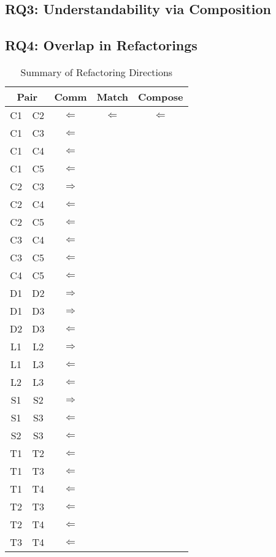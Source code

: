 \subsection{RQ3: Understandability via Composition}

\subsection{RQ4: Overlap in Refactorings}

\begin{table}[t]
\caption{Summary of Refactoring Directions \label{summaryResults}}
\begin{center}
\begin{tabular}{|cc | c c c|} \hline
\multicolumn{2}{|c|}{\textbf{Pair}} & \textbf{Comm} & \textbf{Match} & \textbf{Compose} \\ \hline \hline
C1 & C2 & $\Leftarrow$  & $\Leftarrow$ & $\Leftarrow$ \\
C1 & C3 & $\Leftarrow$ & & \\
C1 & C4 & $\Leftarrow$ & & \\
C1 & C5 & $\Leftarrow$ & & \\
C2 & C3 & $\Rightarrow$ & & \\
C2 & C4 & $\Leftarrow$ & & \\
C2 & C5 & $\Leftarrow$ & & \\
C3 & C4 & $\Leftarrow$ & & \\
C3 & C5 & $\Leftarrow$ & & \\
C4 & C5 & $\Leftarrow$ & & \\
\hline
D1 & D2 & $\Rightarrow$ & & \\
D1 & D3 & $\Rightarrow$ & & \\
D2 & D3 & $\Leftarrow$ & & \\
\hline
L1 & L2 & $\Rightarrow$ & & \\
L1 & L3 & $\Leftarrow$ & & \\
L2 & L3 & $\Leftarrow$ & & \\
\hline 
S1 & S2 & $\Rightarrow$ & & \\
S1 & S3 & $\Leftarrow$ & & \\
S2 & S3 & $\Leftarrow$ & & \\
\hline 
T1 & T2 & $\Leftarrow$  & & \\
T1 & T3 & $\Leftarrow$ & & \\
T1 & T4 & $\Leftarrow$ & & \\
T2 & T3 & $\Leftarrow$ & & \\
T2 & T4 & $\Leftarrow$ & & \\
T3 & T4 & $\Leftarrow$ & & \\
\hline


\end{tabular}
\end{center}
\end{table}


